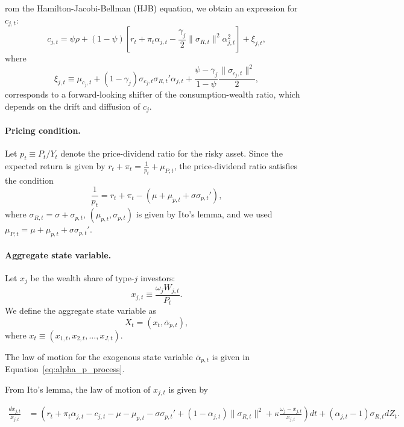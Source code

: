 rom the Hamilton-Jacobi-Bellman (HJB) equation, we obtain an expression for $c_{j,t}$:
\begin{equation}\label{eq:xi_j}
	c_{j,t} = \psi \rho + (1-\psi) \left[ r_t + \pi_t \alpha_{j,t} - \frac{\gamma_j}{2} \|\sigma_{R,t}\|^2 \alpha_{j,t}^2\right] + \xi_{j,t},
\end{equation}
where 
\begin{equation}\label{eq:shifter}
	\xi_{j,t} \equiv \mu_{c_j,t} + (1-\gamma_j)  \sigma_{c_j,t} \sigma_{R,t}' \alpha_{j,t} + \frac{\psi - \gamma_j}{1-\psi} \frac{\|\sigma_{c_j,t}\|^2}{2},
\end{equation} corresponds to a forward-looking shifter of the consumption-wealth ratio, which depends on the drift and diffusion of $c_j$.

\paragraph{Pricing condition.} Let $p_t \equiv P_t/Y_t$ denote the price-dividend ratio for the risky asset. Since the expected return is given by $r_t + \pi_t = \frac{1}{p_t} + \mu_{P,t}$, the price-dividend ratio satisfies the condition
\begin{equation}\label{eq:pricing_cond}
	\frac{1}{p_t} = r_t + \pi_t  -(\mu + \mu_{p,t} + \sigma \sigma_{p,t}'),
\end{equation}
where $\sigma_{R,t} = \sigma + \sigma_{p,t}$, $(\mu_{p,t}, \sigma_{p,t})$ is given by Ito's lemma, and we used $\mu_{P,t} =\mu + \mu_{p,t} + \sigma \sigma_{p,t}' $.

\paragraph{Aggregate state variable.} Let $x_j$ be the wealth share of type-$j$ investors:
\begin{equation}
	x_{j,t} \equiv \frac{\omega_j W_{j,t}}{P_t}.\nonumber
\end{equation}
We define the aggregate state variable as 
\begin{equation}\label{eq:agg-state-var}
	X_t = (x_t, \overline{\alpha}_{p,t}), 
\end{equation}
where $x_t \equiv \left(x_{1,t}, x_{2,t}, \ldots, x_{J,t}\right )$. 

The law of motion for the exogenous state variable $\overline{\alpha}_{p,t}$ is given in Equation~\eqref{eq:alpha_p_process}.


From Ito's lemma, the law of motion of $x_{j,t}$ is given by
\begin{small}
	\begin{align*}
		\frac{d x_{j,t}}{x_{j,t}} &= \left( r_t + \pi_t \alpha_{j,t} - c_{j,t} -\mu - \mu_{p,t} - \sigma \sigma_{p,t}'  +(1- \alpha_{j,t}) \|\sigma_{R,t}\|^2  +\kappa \frac{\omega_j-x_{j,t}}{x_{j,t}}  \right) dt + \left (\alpha_{j,t} - 1\right ) \sigma_{R,t} d Z_t.
	\end{align*}
\end{small}


